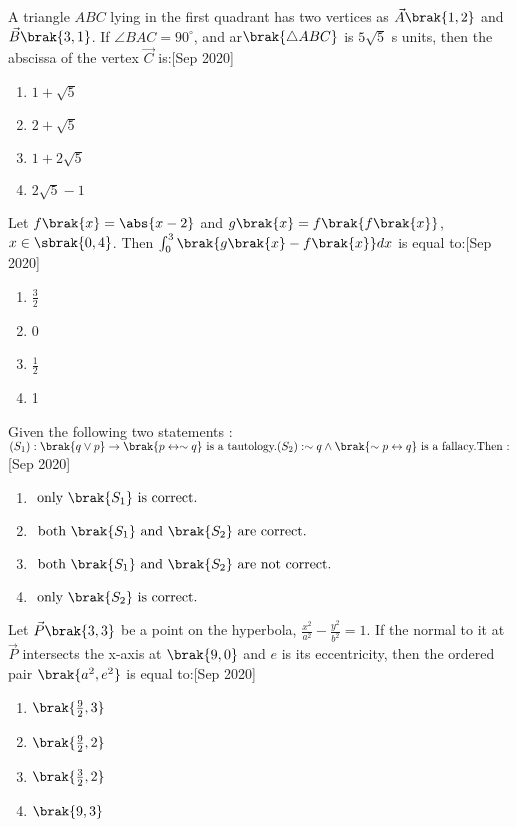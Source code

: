 \item A triangle $ABC$ lying in the first quadrant has two vertices as $ \vec{A}\brak{1,2}$ and $\vec{B}\brak{3,1}$. If $\angle BAC=90^\circ$, and ar$\brak{\triangle ABC}$ is $5\sqrt{5}$ s units, then the abscissa of the vertex $\vec{C}$ is:\hfill{[Sep 2020]}
\begin{enumerate}
    \item $1+\sqrt{5}$
    \item $2+\sqrt{5}$
    \item $1+2\sqrt{5}$
    \item $2\sqrt{5}-1$
\end{enumerate}
\item Let $f\brak{x}=\abs{x-2}$ and $g\brak{x}=f\brak{f\brak{x}}$,$x\in \sbrak{0, 4}$. Then $\int_0^3 \brak{g\brak{x}-f\brak{x}} dx$ is equal to:\hfill{[Sep 2020]}
\begin{enumerate}
    \item $\frac{3}{2}$
    \item 0
    \item $\frac{1}{2}$
    \item 1
\end{enumerate}
\item Given the following two statements : \\
$(S_{1}) : \brak{q \vee p} \rightarrow \brak{p \leftrightarrow \sim q} \text{ is a tautology.} \\
(S_{2}) : \sim q \wedge \brak{\sim p \leftrightarrow q} \text{ is a fallacy.} \\
\text{Then :}$ \\\hfill{[Sep 2020]}
\begin{enumerate}
\item $\text{ only } \brak{S_{1}} \text{ is correct.}$
\item $\text{ both } \brak{S_{1}} \text{ and } \brak{S_{2}} \text{ are correct.}$
\item $\text{ both } \brak{S_{1}} \text{ and } \brak{S_{2}} \text{ are not correct.}$
\item $\text{ only } \brak{S_{2}} \text{ is correct.}$
\end{enumerate}
\item Let $\vec{P}\brak{3,3}$ be a point on the hyperbola, $\frac{x^2}{a^2}-\frac{y^2}{b^2}=1$. If the normal to it at $\vec{P}$ intersects the x-axis at $\brak{9,0}$ and $e$ is its eccentricity, then the ordered pair $\brak{a^2, e^2}$ is equal to:\hfill{[Sep 2020]}
\begin{enumerate}
    \item $\brak{\frac{9}{2},3}$
    \item $\brak{\frac{9}{2},2}$
    \item $\brak{\frac{3}{2},2}$
    \item $\brak{9,3}$
\end{enumerate}
